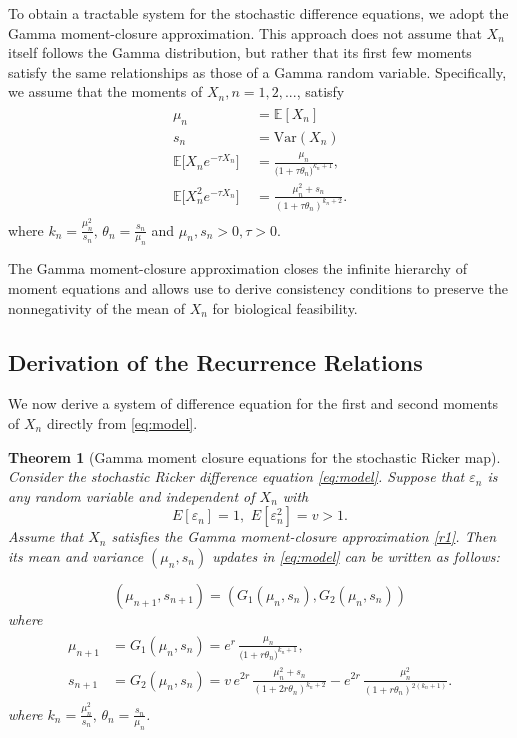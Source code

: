 \documentclass[12pt]{article}
\newtheorem{theorem}{Theorem}[section]
\theoremstyle{definition}
\begin{document}
To obtain a tractable system for the stochastic difference equations, we adopt the Gamma moment-closure approximation. This approach does not assume that $X_n$ itself follows the Gamma distribution,  but rather that its first few moments satisfy the same relationships as those of a Gamma random variable. 
Specifically, we assume that the moments of $X_n, n=1,2,...$, satisfy
\begin{align}
\begin{aligned}
\mu_n \qquad\qquad & = \mathbb{E}[X_n]\\
 s_n \qquad\qquad &= \mathrm{Var}(X_n) \\
\mathbb{E}\big[X_n e^{-\tau X_n}\big] &= \frac{\mu_n}{\big(1 + \tau \theta_n\big)^{k_n+1}}, \\
\mathbb{E}\big[X_n^2 e^{-\tau X_n}\big] &= \frac{\mu_n^2+s_n}{(1+\tau \theta_n)^{k_n+2}}.
\end{aligned}
\label{r1}
\end{align}
where $ k_n=\frac{\mu_n^2}{s_n}, \, \theta_n=\frac{s_n}{\mu_n}$ and $\mu_n, s_n>0, \tau>0$.

The Gamma moment-closure approximation closes the infinite hierarchy of moment equations and allows use to derive consistency conditions to preserve the nonnegativity of the mean of $X_n$ for biological feasibility.

\subsection{Derivation of the Recurrence Relations}

We now derive a system of difference equation for the first and second moments of $X_{n}$ directly from \eqref{eq:model}.

\begin{theorem}[Gamma moment closure equations for the stochastic Ricker map] \label{differeceEq}
Consider the stochastic Ricker difference equation \eqref{eq:model}. Suppose that $\varepsilon_n$ 
is any random variable and independent of $X_n$ with $$E[\varepsilon_n] = 1, \,\,E[\varepsilon_n^2] = v > 1.$$ Assume that $X_n$ satisfies the Gamma moment-closure approximation \eqref{r1}.  Then its mean and variance \((\mu_n,s_n)\) updates in \eqref{eq:model}  can be written as follows:

\begin{equation}\label{eq:closed-mu-s}
(\mu_{n+1},s_{n+1}) = (G_1(\mu_n,s_n), G_2(\mu_n,s_n))
\end{equation}
where
\begin{align}
\begin{aligned}
\mu_{n+1} &= G_1(\mu_n,s_n)= e^{r}\,\frac{\mu_n}{\big(1 + r \theta_n\big)^{k_n+1}}, \\
s_{n+1} & =G_2(\mu_n,s_n)= v\,e^{2r}\,\frac{\mu_n^2+s_n}{(1+2r \theta_n)^{k_n+2}}
- e^{2r}\,\frac{\mu_n^2}{(1+r \theta_n)^{2(k_n+1)}}.
\end{aligned}
\label{expressions}
\end{align}
where $ k_n=\frac{\mu_n^2}{s_n}, \, \theta_n=\frac{s_n}{\mu_n}$.
\end{theorem}
\end{document}
